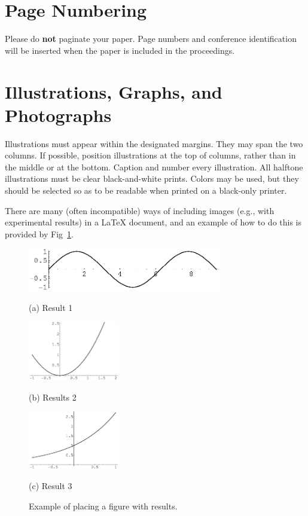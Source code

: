 \documentclass{article}
\begin{document}
\section{Page Numbering}
\label{sec:page}

Please do \textbf{not} paginate your paper.  Page numbers and conference identification will be inserted when the paper is included in the proceedings.

\section{Illustrations, Graphs, and Photographs}
\label{sec:illust}

Illustrations must appear within the designated margins.  They may span the two columns.  If possible, position illustrations at the top of columns, rather than in the middle or at the bottom.  Caption and number every illustration. All halftone illustrations must be clear black-and-white prints.  Colors may be used, but they should be selected so as to be readable when printed on a black-only printer.

There are many (often incompatible) ways of including images (e.g., with experimental results) in a LaTeX document, and an example of how to do
this is provided by Fig~\ref{fig:example}. 

\begin{figure}[tb]
	
	\begin{minipage}[b]{1.0\linewidth}
		\centering
		\centerline{\includegraphics[width=8.5cm]{image1}}
		\centerline{(a) Result 1}\medskip
	\end{minipage}
	\begin{minipage}[b]{.48\linewidth}
		\centering
		\centerline{\includegraphics[width=4.0cm]{image3}}
		\centerline{(b) Results 2}\medskip
	\end{minipage}
	\hfill
	\begin{minipage}[b]{0.48\linewidth}
		\centering
		\centerline{\includegraphics[width=4.0cm]{image4}}
		\centerline{(c) Result 3}\medskip
	\end{minipage}
	\caption{Example of placing a figure with results.}
	\label{fig:example}
\end{figure}
\end{document}

